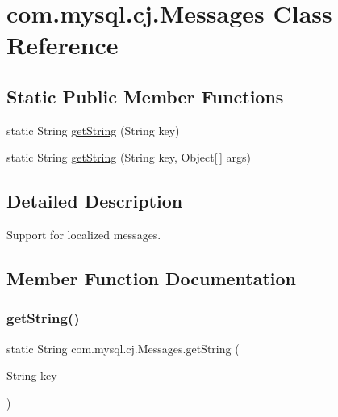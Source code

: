 \hypertarget{classcom_1_1mysql_1_1cj_1_1_messages}{}\section{com.\+mysql.\+cj.\+Messages Class Reference}
\label{classcom_1_1mysql_1_1cj_1_1_messages}
\subsection*{Static Public Member Functions}
\begin{DoxyCompactItemize}
\item 
static String \mbox{\hyperlink{classcom_1_1mysql_1_1cj_1_1_messages_a86a388448aa7759254c491b3e1320d31}{get\+String}} (String key)
\item 
static String \mbox{\hyperlink{classcom_1_1mysql_1_1cj_1_1_messages_afbedd0a83c03079eb52039039a24f386}{get\+String}} (String key, Object\mbox{[}$\,$\mbox{]} args)
\end{DoxyCompactItemize}


\subsection{Detailed Description}
Support for localized messages. 

\subsection{Member Function Documentation}
\mbox{\label{classcom_1_1mysql_1_1cj_1_1_messages_a86a388448aa7759254c491b3e1320d31}} 
\subsubsection{\texorpdfstring{get\+String()}{getString()}\hspace{0.1cm}{\footnotesize\ttfamily [1/2]}}
{\footnotesize\ttfamily static String com.\+mysql.\+cj.\+Messages.\+get\+String (\begin{DoxyParamCaption}\item[{String}]{key }\end{DoxyParamCaption})\hspace{0.3cm}{\ttfamily [static]}}


